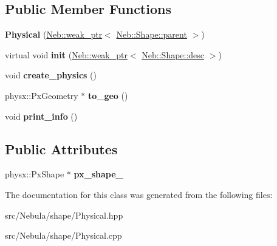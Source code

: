 \subsection*{\-Public \-Member \-Functions}
\begin{DoxyCompactItemize}
\item 
\hypertarget{classNeb_1_1Shape_1_1Physical_a0d74c9bd4583ae80e0eb449e46f812d5}{{\bfseries \-Physical} (\hyperlink{classNeb_1_1weak__ptr}{\-Neb\-::weak\-\_\-ptr}$<$ \hyperlink{classNeb_1_1Shape_1_1parent}{\-Neb\-::\-Shape\-::parent} $>$)}\label{classNeb_1_1Shape_1_1Physical_a0d74c9bd4583ae80e0eb449e46f812d5}

\item 
\hypertarget{classNeb_1_1Shape_1_1Physical_a70b5d338ce2aa6ee1b929a7a3bb2fb93}{virtual void {\bfseries init} (\hyperlink{classNeb_1_1weak__ptr}{\-Neb\-::weak\-\_\-ptr}$<$ \hyperlink{classNeb_1_1Shape_1_1desc}{\-Neb\-::\-Shape\-::desc} $>$)}\label{classNeb_1_1Shape_1_1Physical_a70b5d338ce2aa6ee1b929a7a3bb2fb93}

\item 
\hypertarget{classNeb_1_1Shape_1_1Physical_a383490671f6f3792915196b643fcae3f}{void {\bfseries create\-\_\-physics} ()}\label{classNeb_1_1Shape_1_1Physical_a383490671f6f3792915196b643fcae3f}

\item 
\hypertarget{classNeb_1_1Shape_1_1Physical_a04188cb00ee118ccfa4c84c2593b46d9}{physx\-::\-Px\-Geometry $\ast$ {\bfseries to\-\_\-geo} ()}\label{classNeb_1_1Shape_1_1Physical_a04188cb00ee118ccfa4c84c2593b46d9}

\item 
\hypertarget{classNeb_1_1Shape_1_1Physical_a3c7de2f4c8d96a0c9e7772d793b2bc41}{void {\bfseries print\-\_\-info} ()}\label{classNeb_1_1Shape_1_1Physical_a3c7de2f4c8d96a0c9e7772d793b2bc41}

\end{DoxyCompactItemize}
\subsection*{\-Public \-Attributes}
\begin{DoxyCompactItemize}
\item 
\hypertarget{classNeb_1_1Shape_1_1Physical_a42b1c4b3243313c543d08817cf4d7fdf}{physx\-::\-Px\-Shape $\ast$ {\bfseries px\-\_\-shape\-\_\-}}\label{classNeb_1_1Shape_1_1Physical_a42b1c4b3243313c543d08817cf4d7fdf}

\end{DoxyCompactItemize}


\-The documentation for this class was generated from the following files\-:\begin{DoxyCompactItemize}
\item 
src/\-Nebula/shape/\-Physical.\-hpp\item 
src/\-Nebula/shape/\-Physical.\-cpp\end{DoxyCompactItemize}
